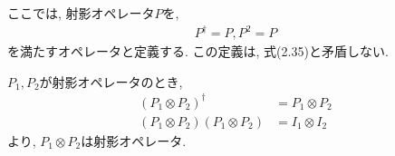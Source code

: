\begin{ex}
    \label{ex2.32}
    ここでは, 射影オペレータ$P$を,
    \begin{align*}
        P^\dagger = P , P^2 = P
    \end{align*}
    を満たすオペレータと定義する. この定義は, 式(2.35)と矛盾しない.
    \par
    $P_1, P_2$が射影オペレータのとき,
    \begin{align*}
        \left( P_1 \otimes P_2 \right)^\dagger
         & =
        P_1 \otimes P_2
        \\
        \left( P_1 \otimes P_2 \right) \left( P_1 \otimes P_2 \right)
         & =
        I_1 \otimes I_2
    \end{align*}
    より, $P_1 \otimes P_2$は射影オペレータ.
\end{ex}

